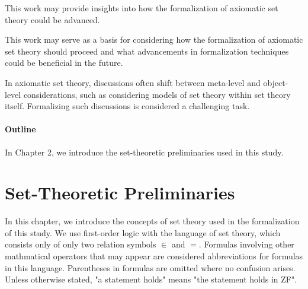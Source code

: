 \documentclass{report}
\begin{document}
This work may provide insights into how the formalization of axiomatic set theory could be advanced.

This work may serve as a basis for considering how the formalization of axiomatic set theory should proceed 
and what advancements in formalization techniques could be beneficial in the future.

In axiomatic set theory, discussions often shift between meta-level and object-level considerations, such as considering models of set theory within set theory itself. 
Formalizing such discussions is considered a challenging task.


\subsubsection{Outline}
In Chapter 2, we introduce the set-theoretic preliminaries used in this study.



\chapter{Set-Theoretic Preliminaries}
In this chapter, we introduce the concepts of set theory used in the formalization of this study.
We use first-order logic with the language of set theory, which consists only of only two relation symbols $\in$ and $=$. 
Formulas involving other mathmatical operators that may appear are considered abbreviations for formulas in this language.
Parentheses in formulas are omitted where no confusion arises.
Unless otherwise stated, "a statement holds" means "the statement holds in ZF".
\end{document}
